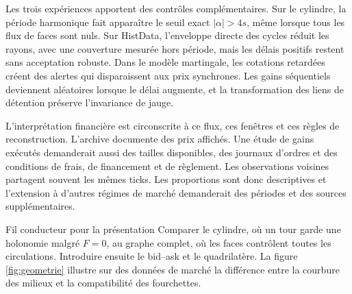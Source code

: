 \documentclass[11pt,a4paper]{article}
\theoremstyle{clair}
\begin{document}
Les trois expériences apportent des contrôles complémentaires. Sur le cylindre, la période harmonique fait apparaître le seuil exact \(|\alpha|>4s\), même lorsque tous les flux de faces sont nuls. Sur HistData, l'enveloppe directe des cycles réduit les rayons, avec une couverture mesurée hors période, mais les délais positifs restent sans acceptation robuste. Dans le modèle martingale, les cotations retardées créent des alertes qui disparaissent aux prix synchrones. Les gains séquentiels deviennent aléatoires lorsque le délai augmente, et la transformation des liens de détention préserve l'invariance de jauge.

L'interprétation financière est circonscrite à ce flux, ces fenêtres et ces règles de reconstruction. L'archive documente des prix affichés. Une étude de gains exécutés demanderait aussi des tailles disponibles, des journaux d'ordres et des conditions de frais, de financement et de règlement. Les observations voisines partagent souvent les mêmes ticks. Les proportions sont donc descriptives et l'extension à d'autres régimes de marché demanderait des périodes et des sources supplémentaires.

\begin{callout}{Fil conducteur pour la présentation}
Comparer le cylindre, où un tour garde une holonomie malgré \(F=0\), au graphe complet, où les faces contrôlent toutes les circulations. Introduire ensuite le bid--ask et le quadrilatère. La figure \ref{fig:geometrie} illustre sur des données de marché la différence entre la courbure des milieux et la compatibilité des fourchettes.
\end{callout}
\end{document}
